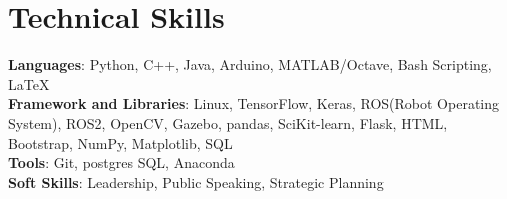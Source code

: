 \documentclass[letterpaper,11pt]{article}
\begin{document}
\section{Technical Skills}
 \begin{itemize}[leftmargin=0.15in, label={}]
    \small{\item{
     \textbf{Languages}{: Python, C++, Java, Arduino, MATLAB/Octave, Bash Scripting, \LaTeX} \\
     \textbf{Framework and Libraries}{: Linux, TensorFlow, Keras, ROS(Robot Operating System), ROS2, OpenCV, Gazebo, pandas, SciKit-learn, Flask, HTML, Bootstrap, NumPy, Matplotlib, SQL} \\
     \textbf{Tools}{: Git, postgres SQL, Anaconda} \\
     \textbf{Soft Skills}{: Leadership, Public Speaking, Strategic Planning} \\
    }}
 \end{itemize}
 \vspace{-16pt}
\end{document}
